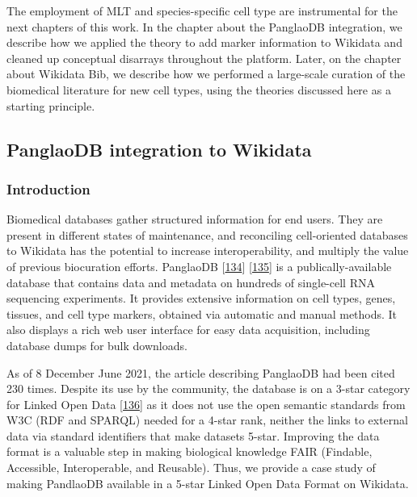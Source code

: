 The employment of MLT and species-specific cell type are instrumental for the next chapters of this work.
In the chapter about the PanglaoDB integration, we describe how we applied the theory to add marker information to Wikidata and cleaned up conceptual disarrays throughout the platform.
Later, on the chapter about Wikidata Bib, we describe how we performed a large-scale curation of the biomedical literature for new cell types, using the theories discussed here as a starting principle.

\hypertarget{panglaodb-integration-to-wikidata}{%
\subsection{PanglaoDB integration to Wikidata}\label{panglaodb-integration-to-wikidata}}

\hypertarget{introduction}{%
\subsubsection{Introduction}\label{introduction}}

Biomedical databases gather structured information for end users.
They are present in different states of maintenance, and reconciling cell-oriented databases to Wikidata has the potential to increase interoperability, and multiply the value of previous biocuration efforts.
PanglaoDB {[}\protect\hyperlink{ref-M0lqRYJb}{134}{]} {[}\protect\hyperlink{ref-T3PlZ3Vh}{135}{]} is a publically-available database that contains data and metadata on hundreds of single-cell RNA sequencing experiments.
It provides extensive information on cell types, genes, tissues, and cell type markers, obtained via automatic and manual methods.
It also displays a rich web user interface for easy data acquisition, including database dumps for bulk downloads.

As of 8 December June 2021, the article describing PanglaoDB had been cited 230 times.
Despite its use by the community, the database is on a 3-star category for Linked Open Data {[}\protect\hyperlink{ref-OGXYtGZ8}{136}{]} as it does not use the open semantic standards from W3C (RDF and SPARQL) needed for a 4-star rank, neither the links to external data via standard identifiers that make datasets 5-star.
Improving the data format is a valuable step in making biological knowledge FAIR (Findable, Accessible, Interoperable, and Reusable).
Thus, we provide a case study of making PandlaoDB available in a 5-star Linked Open Data Format on Wikidata.

